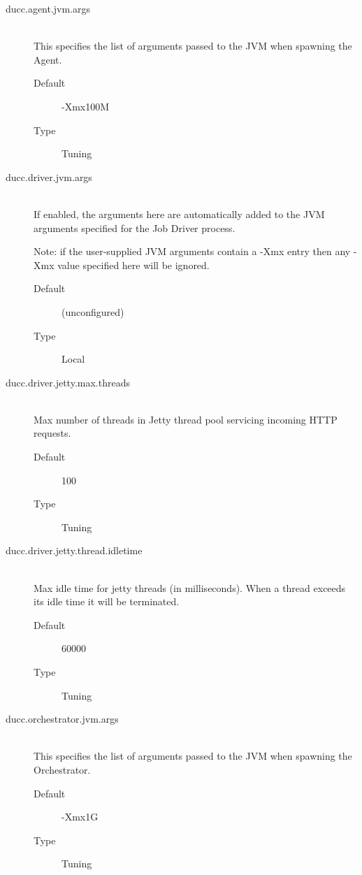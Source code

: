 \begin{description}
       \item[ducc.agent.jvm.args] \hfill \\
         This specifies the list of arguments passed to the JVM when spawning the Agent. 
         \begin{description}           
           \item[Default] -Xmx100M 
           \item[Type] Tuning 
         \end{description}


       \item[ducc.driver.jvm.args] \hfill \\
         If enabled, the arguments here are automatically added to the JVM arguments specified for 
         the Job Driver process. 

         Note: if the user-supplied JVM arguments contain a -Xmx entry then 
         any -Xmx value specified here will be ignored.
         \begin{description}
           \item[Default] (unconfigured) 
           \item[Type] Local 
         \end{description}

       \item[ducc.driver.jetty.max.threads] \hfill \\
         Max number of threads in Jetty thread pool servicing incoming  HTTP requests. 
         \begin{description}
           \item[Default] 100
           \item[Type] Tuning
         \end{description}

       \item[ducc.driver.jetty.thread.idletime] \hfill \\
         Max idle time for jetty threads (in milliseconds). When a thread exceeds
         its idle time it will be terminated.
         \begin{description} 
           \item[Default] 60000
           \item[Type] Tuning
         \end{description}

       \item[ducc.orchestrator.jvm.args] \hfill \\
         This specifies the list of arguments passed to the JVM when spawning the Orchestrator. 
         \begin{description}
           \item[Default] -Xmx1G 
           \item[Type] Tuning 
         \end{description}



\end{description}
